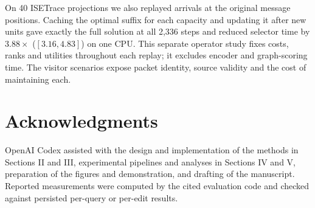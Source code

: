 \documentclass[conference]{IEEEtran}
\begin{document}
On 40 ISETrace projections we also replayed arrivals at the original message positions. Caching the optimal suffix for each capacity and updating it after new units gave exactly the full solution at all 2,336 steps and reduced selector time by $3.88\times$ ($[3.16,4.83]$) on one CPU. This separate operator study fixes costs, ranks and utilities throughout each replay; it excludes encoder and graph-scoring time. The visitor scenarios expose packet identity, source validity and the cost of maintaining each.

\section*{Acknowledgments}
OpenAI Codex assisted with the design and implementation of the methods in Sections II and III, experimental pipelines and analyses in Sections IV and V, preparation of the figures and demonstration, and drafting of the manuscript. Reported measurements were computed by the cited evaluation code and checked against persisted per-query or per-edit results.



\end{document}

